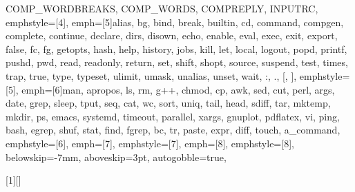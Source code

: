 {{         COMP_WORDBREAKS, COMP_WORDS, COMPREPLY, INPUTRC},
emphstyle=[4]{\color{environment-color}}, %
emph=[5]{alias, bg, bind, break, builtin, cd, command, compgen, complete, continue, declare, dirs, disown, echo, enable, eval,
         exec, exit, export, false, fc, fg, getopts, hash, help, history, jobs, kill, let, local, logout, popd, printf, pushd, pwd,
         read, readonly, return, set, shift, shopt, source, suspend, test, times, trap, true, type, typeset, ulimit, umask,
         unalias, unset, wait, :, ., [, ]},
emphstyle=[5]{\color{builtins-color}}, %
emph=[6]{man, apropos, ls, rm, g++, chmod, cp, awk, sed, cut, perl, args, date, grep, sleep, tput, seq, cat, wc, sort, uniq, tail,
         head, sdiff, tar, mktemp, mkdir, ps, emacs, systemd, timeout, parallel, xargs, gnuplot, pdflatex, vi, ping, bash,
         egrep, shuf, stat, find, fgrep, bc, tr, paste, expr, diff, touch, a_command},
emphstyle=[6]{\color{external-color}}, %
emph=[7]{},
emphstyle=[7]{\color{variables-color}}, %
emph=[8]{},
emphstyle=[8]{\color{builtins-color}}, %
%
belowskip=-7mm,
aboveskip=3pt,
autogobble=true, %
}

[1][] %
    {\lstset{style=MyBash, #1}}
    {}

\def\bash{\lstinline[style=MyBash, basicstyle=\ttfamily\color{black}]}



